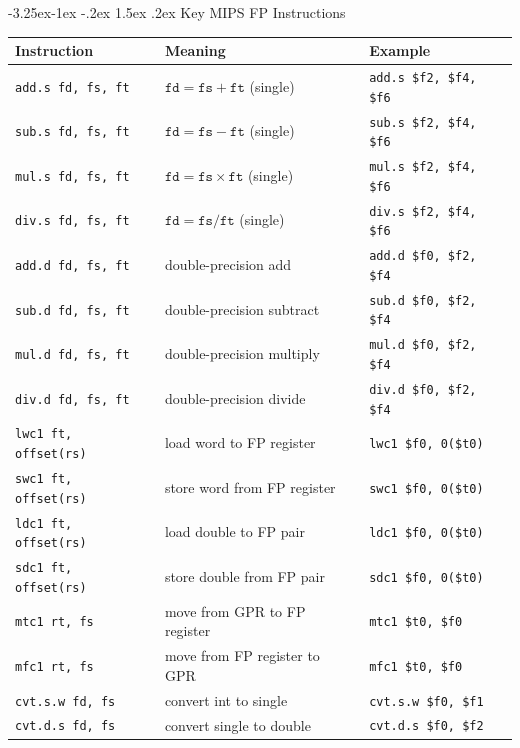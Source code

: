 \documentclass{article}
\makeatletter
\theoremstyle{remark}
\newlength{\subsecindent}
\renewcommand\subsection{\@startsection{subsection}{2}{\subsecindent}%
  {-3.25ex\@plus -1ex \@minus -.2ex}%
  {1.5ex \@plus .2ex}%
  {\normalfont\large\bfseries}}
\newenvironment{sub}{%
  \begin{list}{}{%
    \setlength{\leftmargin}{4em}%
    \setlength{\rightmargin}{0pt}%
    \setlength{\topsep}{0pt}%
    \setlength{\partopsep}{0pt}%
    \setlength{\parsep}{\parskip}%
    \setlength{\itemsep}{\parskip}%
  }\item\relax
}{\end{list}}
\makeatother
\begin{document}
\subsection{Key MIPS FP Instructions}
\begin{sub}
\begin{center}
\begin{tabular}{lll}
\toprule
\textbf{Instruction} & \textbf{Meaning} & \textbf{Example} \\
\midrule
\texttt{add.s fd, fs, ft} & $\texttt{fd} = \texttt{fs} + \texttt{ft}$ (single) & \texttt{add.s \$f2, \$f4, \$f6} \\
\texttt{sub.s fd, fs, ft} & $\texttt{fd} = \texttt{fs} - \texttt{ft}$ (single) & \texttt{sub.s \$f2, \$f4, \$f6} \\
\texttt{mul.s fd, fs, ft} & $\texttt{fd} = \texttt{fs} \times \texttt{ft}$ (single) & \texttt{mul.s \$f2, \$f4, \$f6} \\
\texttt{div.s fd, fs, ft} & $\texttt{fd} = \texttt{fs} / \texttt{ft}$ (single) & \texttt{div.s \$f2, \$f4, \$f6} \\
\midrule
\texttt{add.d fd, fs, ft} & double-precision add & \texttt{add.d \$f0, \$f2, \$f4} \\
\texttt{sub.d fd, fs, ft} & double-precision subtract & \texttt{sub.d \$f0, \$f2, \$f4} \\
\texttt{mul.d fd, fs, ft} & double-precision multiply & \texttt{mul.d \$f0, \$f2, \$f4} \\
\texttt{div.d fd, fs, ft} & double-precision divide & \texttt{div.d \$f0, \$f2, \$f4} \\
\midrule
\texttt{lwc1 ft, offset(rs)} & load word to FP register & \texttt{lwc1 \$f0, 0(\$t0)} \\
\texttt{swc1 ft, offset(rs)} & store word from FP register & \texttt{swc1 \$f0, 0(\$t0)} \\
\texttt{ldc1 ft, offset(rs)} & load double to FP pair & \texttt{ldc1 \$f0, 0(\$t0)} \\
\texttt{sdc1 ft, offset(rs)} & store double from FP pair & \texttt{sdc1 \$f0, 0(\$t0)} \\
\midrule
\texttt{mtc1 rt, fs} & move from GPR to FP register & \texttt{mtc1 \$t0, \$f0} \\
\texttt{mfc1 rt, fs} & move from FP register to GPR & \texttt{mfc1 \$t0, \$f0} \\
\texttt{cvt.s.w fd, fs} & convert int to single & \texttt{cvt.s.w \$f0, \$f1} \\
\texttt{cvt.d.s fd, fs} & convert single to double & \texttt{cvt.d.s \$f0, \$f2} \\
\bottomrule
\end{tabular}
\end{center}
\end{sub}
\end{document}
